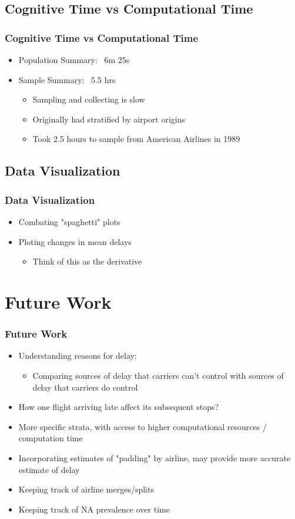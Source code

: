 \documentclass{beamer}
\begin{document}
\subsection{Cognitive Time vs Computational Time}
\begin{frame}
\frametitle{Cognitive Time vs Computational Time}
\begin{itemize}
\item Population Summary: ~6m 25s
\item Sample Summary: ~5.5 hrs 
\begin{itemize}
\item Sampling and collecting is slow 
\item Originally had stratified by airport origins 
\item Took 2.5 hours to sample from American Airlines in 1989
\end{itemize}
\end{itemize}

\end{frame}

\subsection{Data Visualization}
\begin{frame}
\frametitle{Data Visualization}
\begin{itemize}
\item Combating "spaghetti" plots
\item Ploting changes in mean delays 
\begin{itemize}
\item Think of this as the derivative 
\end{itemize}
\end{itemize}

\end{frame}

\section{Future Work}
\begin{frame}
\frametitle{Future Work}
\begin{itemize}
\item Understanding reasons for delay: 
\begin{itemize}
\item Comparing sources of delay that carriers can't control with sources of delay that carriers do control 
\end{itemize}
\item How one flight arriving late affect its subsequent stops? 
\item More specific strata, with access to higher computational resources / computation time
\item Incorporating estimates of "padding" by airline, may provide more accurate estimate of delay
\item Keeping track of airline merges/splits 
\item Keeping track of NA prevalence over time
\end{itemize}

\end{frame}
\end{document}
